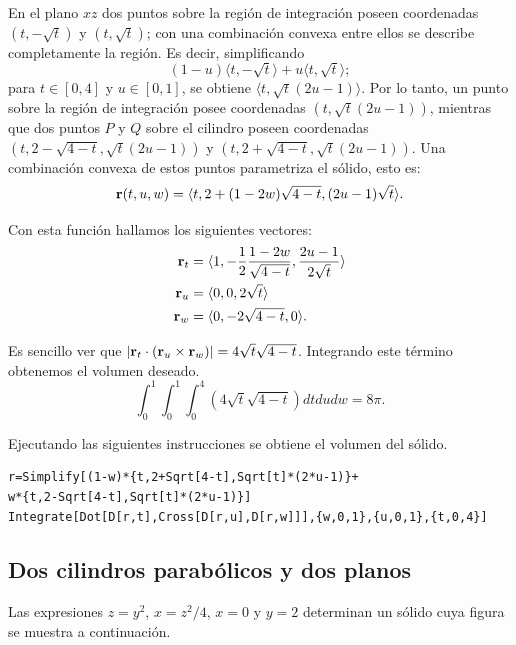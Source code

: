 En el plano $xz$ dos puntos sobre la región de integración poseen coordenadas
$( t,-\sqrt{t})$ y $(t,\sqrt{t})$; con una combinación convexa entre ellos se describe completamente la región.
Es decir, simplificando
%
\[( 1-u) \langle t,-\sqrt{t}\rangle +u\langle t,\sqrt{t}\rangle;\]
%
para $t\in [0,4]$ y $u\in [0,1]$,
se obtiene $\langle t,\sqrt{t}(2u-1)\rangle$. Por lo tanto, un punto sobre la región de integración posee coordenadas $( t,\sqrt{t}( 2u-1))$,
mientras que dos puntos $P$ y $Q$ sobre el cilindro poseen coordenadas
$( t,2-\sqrt{4-t},\sqrt{t}( 2u-1) ) $ y $( t,2+\sqrt{4-t},\sqrt{t}( 2u-1) ) $.
Una combinación convexa de estos puntos parametriza el sólido, esto es:
\[{\bf r}(t,u,w) = \langle t,2+( 1-2w) \sqrt{4-t},( 2u-1) \sqrt{t}\rangle.\]

Con esta función hallamos los siguientes vectores:
\begin{align*}
{\bf r}_t & = \langle 1,-\frac{1}{2}\frac{1-2w}{\sqrt{4-t}},\frac{2u-1}{2\sqrt{t}}\rangle \\
{\bf r}_u & = \langle 0,0,2\sqrt{t}\rangle \\
{\bf r}_w & = \langle 0,-2\sqrt{4-t},0\rangle.
\end{align*}

Es sencillo ver que $|{\bf r}_t \cdot ({\bf r}_u \times {\bf r}_w )| = 4\sqrt{t}\sqrt{4-t}$.
Integrando este término obtenemos el volumen deseado.
\[\int_{0}^{1}\int_{0}^{1}\int_{0}^{4}( 4\sqrt{t}\sqrt{4-t}) dtdudw =8\pi.\]

Ejecutando las siguientes instrucciones se obtiene el volumen del sólido.

\begin{tcolorbox}[title=\bf Instrucción en \verb"Mathematica"]\begin{Verbatim}[formatcom=\letraverbatim]
r=Simplify[(1-w)*{t,2+Sqrt[4-t],Sqrt[t]*(2*u-1)}+
w*{t,2-Sqrt[4-t],Sqrt[t]*(2*u-1)}]
Integrate[Dot[D[r,t],Cross[D[r,u],D[r,w]]],{w,0,1},{u,0,1},{t,0,4}]
\end{Verbatim}
\end{tcolorbox}

\subsection{Dos cilindros parabólicos y dos planos}

\enlargethispage*{\baselineskip}

Las expresiones $z=y^2$, $x=z^2/4$, $x=0$ y $y=2$ determinan un sólido cuya figura se muestra a continuación.

